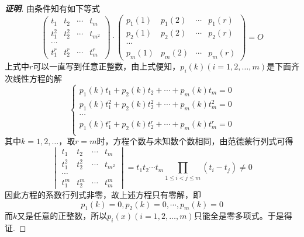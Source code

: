 \documentclass{ctexart}
\begin{document}
\begin{proof}[\textbf{证明}]
  由条件知有如下等式
  \begin{equation*}
    \begin{pmatrix}
      t_1 & t_2 & \cdots & t_m \\
      t_1^2 & t_2^2 & \cdots & t_{m^2} \\
      \cdots \\
      t_1^r & t_2^r & \cdots & t_m^r
    \end{pmatrix}
    \cdot
    \begin{pmatrix}
      p_1(1) & p_1(2) & \cdots & p_1(r) \\
      p_2(1) & p_2(2) & \cdots & p_2(r) \\
      \cdots \\
      p_m(1) & p_m(2) & \cdots & p_m(r)
    \end{pmatrix}
    = O
  \end{equation*}
  上式中$r$可以一直写到任意正整数，由上式便知，$p_i(k)(i=1,2,\ldots,m)$是下面齐次线性方程的解
  \begin{equation*}
    \left\{
        \begin{array}{l}
         p_1(k)t_1+p_2(k)t_2+\cdots+p_m(k)t_m=0 \\
         p_1(k)t_1^2+p_2(k)t_2^2+\cdots+p_m(k)t_m^2=0 \\
          \cdots \\
         p_1(k)t_1^r+p_2(k)t_2^r+\cdots+p_m(k)t_m^r=0 \\
        \end{array}
        \right.
  \end{equation*}
  其中$k=1,2,\ldots$，取$r=m$时，方程个数与未知数个数相同，由范德蒙行列式可得
  \begin{equation*}
    \begin{vmatrix}
      t_1 & t_2 & \cdots & t_m \\
      t_1^2 & t_2^2 & \cdots & t_{m^2} \\
      \cdots \\
      t_1^m & t_2^m & \cdots & t_m^m
    \end{vmatrix}
    = t_1t_2\cdots t_m \prod_{1 \leqslant i < j \leqslant m}(t_i-t_j) \neq 0
  \end{equation*}
  因此方程的系数行列式非零，故上述方程只有零解，即
  \[ p_1(k)=0, p_2(k)=0, \cdots, p_m(k)=0 \]
  而$k$又是任意的正整数，所以$p_i(x)(i=1,2,\ldots,m)$只能全是零多项式。于是得证.
\end{proof}
\end{document}

